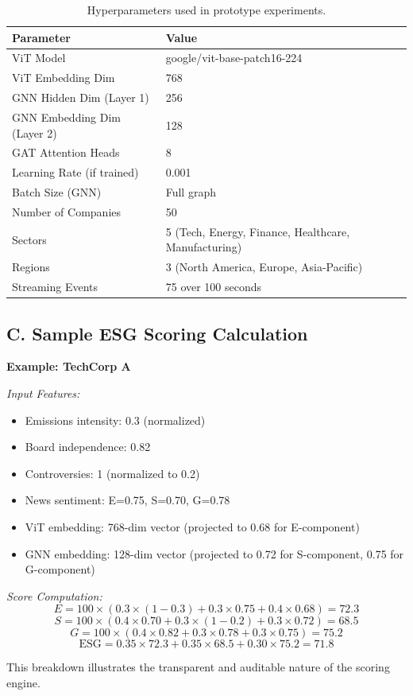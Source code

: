 \begin{table}[h!]
\centering
\small
 \begin{tabular}{l l}
 \hline
 \textbf{Parameter} & \textbf{Value} \\ [0.5ex]
 \hline
 ViT Model & google/vit-base-patch16-224 \\
 ViT Embedding Dim & 768 \\
 GNN Hidden Dim (Layer 1) & 256 \\
 GNN Embedding Dim (Layer 2) & 128 \\
 GAT Attention Heads & 8 \\
 Learning Rate (if trained) & 0.001 \\
 Batch Size (GNN) & Full graph \\
 Number of Companies & 50 \\
 Sectors & 5 (Tech, Energy, Finance, Healthcare, Manufacturing) \\
 Regions & 3 (North America, Europe, Asia-Pacific) \\
 Streaming Events & 75 over 100 seconds \\ [0.5ex]
 \hline
 \end{tabular}
 \caption*{Hyperparameters used in prototype experiments.}
\end{table}

\subsection*{C. Sample ESG Scoring Calculation}

\textbf{Example: TechCorp A}

\textit{Input Features:}
\begin{itemize}
\item Emissions intensity: 0.3 (normalized)
\item Board independence: 0.82
\item Controversies: 1 (normalized to 0.2)
\item News sentiment: E=0.75, S=0.70, G=0.78
\item ViT embedding: 768-dim vector (projected to 0.68 for E-component)
\item GNN embedding: 128-dim vector (projected to 0.72 for S-component, 0.75 for G-component)
\end{itemize}

\textit{Score Computation:}
\[
E = 100 \times (0.3 \times (1-0.3) + 0.3 \times 0.75 + 0.4 \times 0.68) = 72.3
\]
\[
S = 100 \times (0.4 \times 0.70 + 0.3 \times (1-0.2) + 0.3 \times 0.72) = 68.5
\]
\[
G = 100 \times (0.4 \times 0.82 + 0.3 \times 0.78 + 0.3 \times 0.75) = 75.2
\]
\[
\text{ESG} = 0.35 \times 72.3 + 0.35 \times 68.5 + 0.30 \times 75.2 = 71.8
\]

This breakdown illustrates the transparent and auditable nature of the scoring engine.
